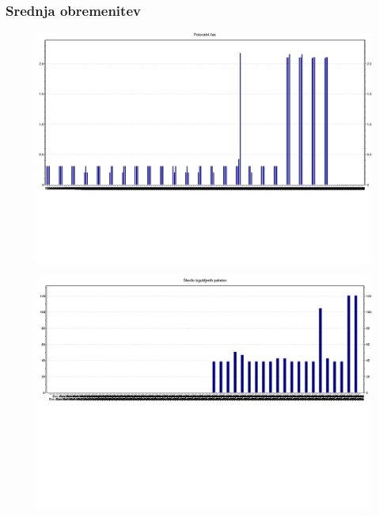 \documentclass[11pt,a4paper,slovene]{myarticle}
\begin{document}
\subsubsection{Srednja obremenitev}
\begin{figure}[H]
\includegraphics[scale=0.40]{slike/bus/SREpotovalniCas.png}
\end{figure}
\begin{figure}[H]
\includegraphics[scale=0.40]{slike/bus/SREstIzgubljenihPaketov.png}
\end{figure}
\end{document}
